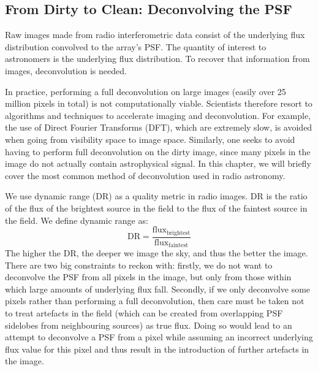 \subsection{From Dirty to Clean: Deconvolving the PSF}\label{section.clean}

\pg
Raw images made from radio interferometric data consist of the underlying flux distribution convolved to the array's PSF. The quantity of interest to astronomers is the underlying flux distribution. To recover that information from images, deconvolution is needed.

\pg
In practice, performing a full deconvolution on large images (easily over 25 million pixels in total) is not computationally viable. Scientists therefore resort to algorithms and techniques to accelerate imaging and deconvolution. For example, the use of Direct Fourier Transforms (DFT), which are extremely slow, is avoided when going from visibility space to image space. Similarly, one seeks to avoid having to perform full deconvolution on the dirty image, since many pixels in the image do not actually contain astrophysical signal. In this chapter, we will briefly cover the most common method of deconvolution used in radio astronomy.

\pg
We use dynamic range (DR) as a quality metric in radio images. DR is the ratio of the flux of the brightest source in the field to the flux of the faintest source in the field.  We define dynamic range as:
\begin{equation}\label{eq.DR.imag}
\mathrm{DR} = \frac{\mathrm{flux}_\mathrm{brightest}}{\mathrm{flux}_\mathrm{faintest}}
\end{equation}
The higher the DR, the deeper we image the sky, and thus the better the image. There are two big constraints to reckon with: firstly, we do not want to deconvolve the PSF from all pixels in the image, but only from those within which large amounts of underlying flux fall. Secondly, if we only deconvolve some pixels rather than performing a full deconvolution, then care must be taken not to treat artefacts in the field (which can be created from overlapping PSF sidelobes from neighbouring sources) as true flux. Doing so would lead to an attempt to deconvolve a PSF from a pixel while assuming an incorrect underlying flux value for this pixel and thus result in the introduction of further artefacts in the image.

